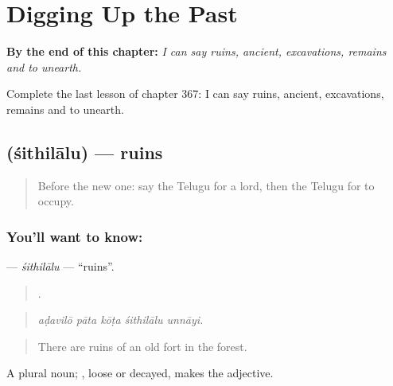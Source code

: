 
\chapter{Digging Up the Past}
\label{ch:te-digging-up-the-past}

\begin{chapteropening}
\textbf{By the end of this chapter:} \emph{I can say ruins, ancient, excavations, remains and to unearth.}

Complete the last lesson of chapter 367: I can say ruins, ancient, excavations, remains and to unearth.
\end{chapteropening}

\section[\texorpdfstring{\te{శిథిలాలు} (śithilālu)}{శిథిలాలు (śithilālu)}]{ (śithilālu) — ruins}

\label{lesson:TE-C367-sithilalu}



\begin{quote}
Before the new one: say the Telugu for a lord, then the Telugu for to occupy.
\end{quote}

\subsection*{You'll want to know: }
\textbf{} — \emph{śithilālu} — \textquotedblleft{}ruins\textquotedblright{}.

\begin{quote}
    .
\end{quote}

\begin{quote}
\emph{aḍavilō pāta kōṭa śithilālu unnāyi.}
\end{quote}

\begin{quote}
There are ruins of an old fort in the forest.
\end{quote}

A plural noun; , loose or decayed, makes the adjective.

